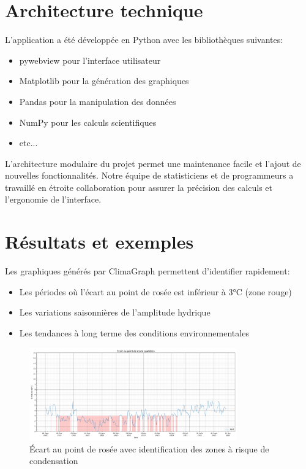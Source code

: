 \documentclass[a4paper,11pt]{article}
\begin{document}
\section{Architecture technique}

L'application a été développée en Python avec les bibliothèques suivantes:
\begin{itemize}
    \item pywebview pour l'interface utilisateur
    \item Matplotlib pour la génération des graphiques
    \item Pandas pour la manipulation des données
    \item NumPy pour les calculs scientifiques
    \item etc... 
\end{itemize}

L'architecture modulaire du projet permet une maintenance facile et l'ajout de nouvelles fonctionnalités. Notre équipe de statisticiens et de programmeurs a travaillé en étroite collaboration pour assurer la précision des calculs et l'ergonomie de l'interface.

\section{Résultats et exemples}

Les graphiques générés par ClimaGraph permettent d'identifier rapidement:
\begin{itemize}
    \item Les périodes où l'écart au point de rosée est inférieur à 3°C (zone rouge)
    \item Les variations saisonnières de l'amplitude hydrique
    \item Les tendances à long terme des conditions environnementales
\end{itemize}

\begin{figure}[h]
    \centering
    \includegraphics[width=0.8\textwidth]{../screenshots/Écart_au_point_de_rosée_(risque_de_condensation)-id-dew_point_risk-20250506_143243.png}
    \caption{Écart au point de rosée avec identification des zones à risque de condensation}
\end{figure}
\end{document}
